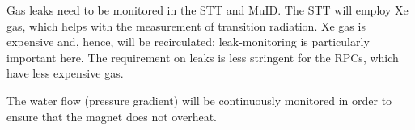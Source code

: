 Gas leaks need to be monitored in the STT and MuID.
The STT will employ Xe gas, which helps with the measurement of transition radiation.
Xe gas is expensive and, hence, will be recirculated; leak-monitoring is particularly important here.   
The requirement on leaks is less 
stringent for the RPCs, which have less expensive gas.

The water flow (pressure gradient) will be continuously monitored in order to ensure 
that the magnet does not overheat. 

